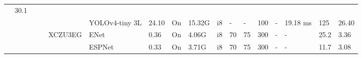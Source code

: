 \begin{table}
\begin{adjustbox}{totalheight=\baselineskip,}
\begin{tabular}{ccccclp{2em}cp{3em}cp{2em}p{4em}p{3em}p{3.5em}p{3.5em}p{2.5em}p{3em}}
                                                               &\multirow{1}{*}{30.1}\\
   &   &   &   &   &\multirow{1}{*}{YOLOv4-tiny 3L}
                       &\multirow{1}{*}{24.10}
                           &\multirow{1}{*}{On}
                               &\multirow{1}{*}{15.32G}
                                   &\multirow{1}{*}{i8}
                                       &\multirow{1}{*}{-}
                                           &\multirow{1}{*}{-}
                                               &\multirow{1}{*}{100}
                                                   &\multirow{1}{*}{-}
                                                       &\multirow{1}{*}{19.18 ms}
                                                           &\multirow{1}{*}{125}
                                                               &\multirow{1}{*}{26.40}\\
\cmidrule{4-17}
   &   &   &\multirow{4}{*}{\cite{sabogalMethodologyEvaluatingAnalyzing2021a}}
               &\multirow{4}{*}{XCZU3EG}
                   &\multirow{1}{*}{ENet}
                       &\multirow{1}{*}{0.36}
                           &\multirow{1}{*}{On}
                               &\multirow{1}{*}{4.06G}
                                   &\multirow{1}{*}{i8}
                                       &\multirow{1}{*}{70}
                                           &\multirow{1}{*}{75}
                                               &\multirow{1}{*}{300}
                                                   &\multirow{1}{*}{-}
                                                       &\multirow{1}{*}{-}
                                                           &\multirow{1}{*}{25.2}
                                                               &\multirow{1}{*}{3.36}\\
   &   &   &   &   &\multirow{1}{*}{ESPNet}
                       &\multirow{1}{*}{0.33}
                           &\multirow{1}{*}{On}
                               &\multirow{1}{*}{3.71G}
                                   &\multirow{1}{*}{i8}
                                       &\multirow{1}{*}{70}
                                           &\multirow{1}{*}{75}
                                               &\multirow{1}{*}{300}
                                                   &\multirow{1}{*}{-}
                                                       &\multirow{1}{*}{-}
                                                           &\multirow{1}{*}{11.7}
                                                               &\multirow{1}{*}{3.08}\\

\end{tabular}
\end{adjustbox}
\end{table}
